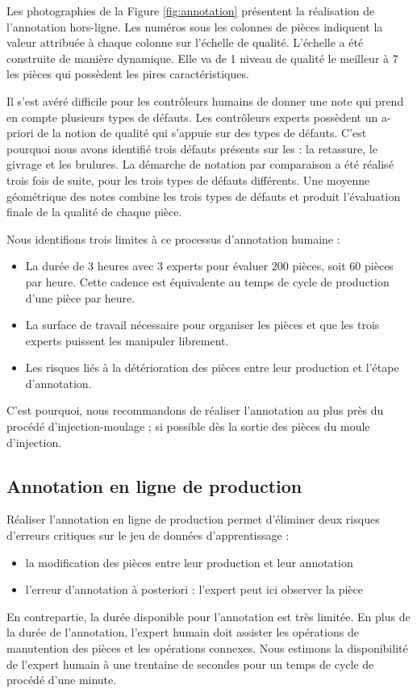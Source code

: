 Les photographies de la Figure \ref{fig:annotation} présentent la réalisation de l'annotation hors-ligne.
Les numéros sous les colonnes de pièces indiquent la valeur attribuée à chaque colonne sur l'échelle de qualité.
L'échelle a été construite de manière dynamique.
Elle va de 1 \textemdash niveau de qualité le meilleur \textemdash à 7 \textemdash les pièces qui possèdent les pires caractéristiques.

Il s'est avéré difficile pour les contrôleurs humains de donner une note qui prend en compte plusieurs types de défauts.
Les contrôleurs experts possèdent un a-priori de la notion de qualité qui s'appuie sur des types de défauts.
C'est pourquoi nous avons identifié trois défauts présents sur les : la retassure, le givrage et les brulures.
La démarche de notation par comparaison a été réalisé trois fois de suite, pour les trois types de défauts différents.
Une moyenne géométrique des notes combine les trois types de défauts et produit l'évaluation finale de la qualité de chaque pièce.

\noindent
Nous identifions trois limites à ce processus d'annotation humaine :
\begin{itemize}
\item La durée de 3 heures avec 3 experts pour évaluer 200 pièces, soit 60 pièces par heure. Cette cadence est équivalente au temps de cycle de production d'une pièce par heure.
\item La surface de travail nécessaire pour organiser les pièces et que les trois experts puissent les manipuler librement.
\item Les risques liés à la détérioration des pièces entre leur production et l'étape d'annotation.
\end{itemize}
C'est pourquoi, nous recommandons de réaliser l'annotation au plus près du procédé d'injection-moulage ; si possible dès la sortie des pièces du moule d'injection.

\subsection{Annotation en ligne de production}
Réaliser l'annotation en ligne de production permet d'éliminer deux risques d'erreurs critiques sur le jeu de données d'apprentissage :
\begin{itemize}
    \item la modification des pièces entre leur production et leur annotation
    \item l'erreur d'annotation à posteriori : l'expert peut ici observer la pièce
\end{itemize}
En contrepartie, la durée disponible pour l'annotation est très limitée. En plus de la durée de l'annotation, l'expert humain doit assister les opérations de manutention des pièces et les opérations connexes.
Nous estimons la disponibilité de l'expert humain à une trentaine de secondes pour un temps de cycle de procédé d'une minute.

